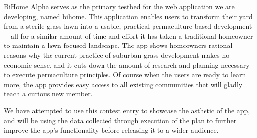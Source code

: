 \documentclass[a4paper]{article}
\begin{document}
BiHome Alpha serves as the primary testbed for the web application we are developing, named
bihome. This application enables users to transform their yard from a sterile grass lawn into a
usable, practical permaculture based development -{}- all for a similar amount of time and effort it
has taken a traditional homeowner to maintain a lawn-focused landscape. The app shows homeowners
rational reasons why the current practice of suburban grass development makes no economic sense, and
it cuts down the amount of research and planning necessary to execute permaculture principles. Of
course when the users are ready to learn more, the app provides easy access to all existing
communities that will gladly teach a curious new member.

We have attempted to use this contest entry to showcase the asthetic of the app, and will be using
the data collected through execution of the plan to further improve the app's functionality before
releasing it to a wider audience.
\end{document}
